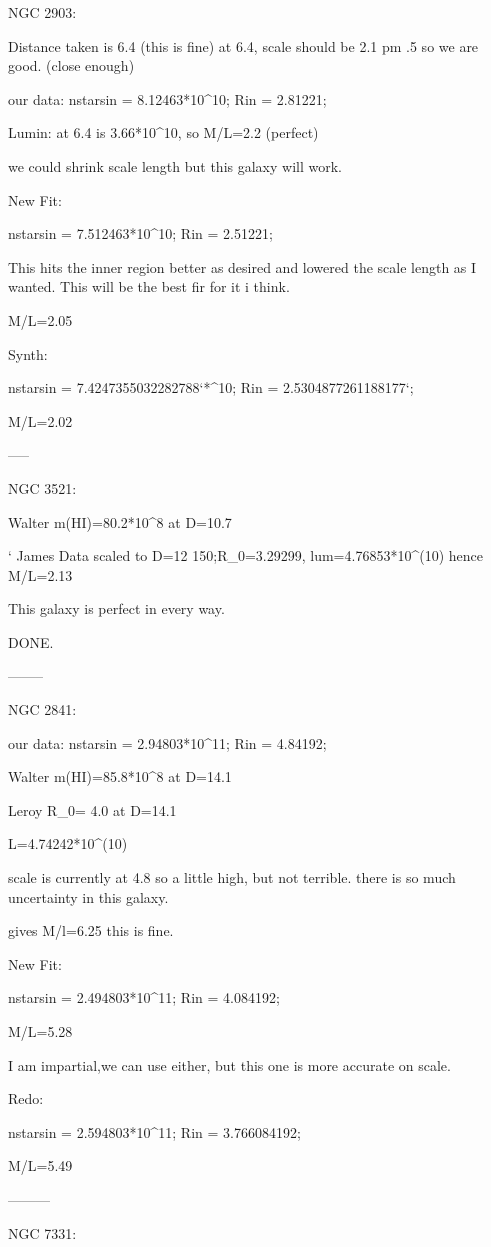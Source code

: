 NGC 2903:

Distance taken is 6.4 (this is fine)
at 6.4, scale should be 2.1 pm .5 so we are good. (close enough)

our data:
nstarsin = 8.12463*10^10;
Rin = 2.81221;

Lumin: at 6.4 is 3.66*10^10, so 
M/L=2.2  (perfect)

we could shrink scale length but this galaxy will work.

New Fit:

nstarsin = 7.512463*10^10;
Rin = 2.51221;

This hits the inner region better as desired and lowered the scale length as I wanted.  This will be the best fir for it i think.

M/L=2.05

Synth:

nstarsin = 7.4247355032282788`*^10;
Rin = 2.5304877261188177`;

M/L=2.02

-----

NGC 3521:

Walter m(HI)=80.2*10^8 at D=10.7

`
James Data scaled to D=12 150;R_0=3.29299, lum=4.76853*10^(10)
hence M/L=2.13

This galaxy is perfect in every way.

DONE.

--------

NGC 2841:

our data:
nstarsin = 2.94803*10^11;
Rin = 4.84192;

Walter m(HI)=85.8*10^8 at D=14.1

Leroy R_0= 4.0 at D=14.1

L=4.74242*10^(10)

scale is currently at 4.8 so a little high, but not terrible.  there is so much uncertainty in this galaxy.

gives M/l=6.25 this is fine.

New Fit:

nstarsin = 2.494803*10^11;
Rin = 4.084192;

M/L=5.28

I am impartial,we can use either, but this one is more accurate on scale.


Redo:

nstarsin = 2.594803*10^11;
Rin = 3.766084192;

M/L=5.49

---------

NGC 7331:

